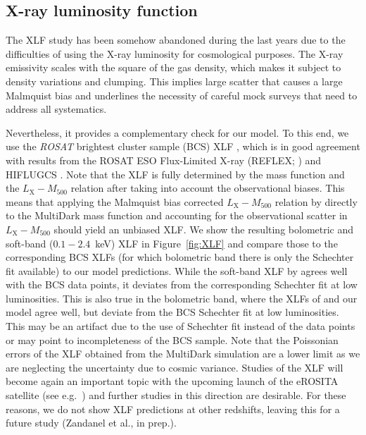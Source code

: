 \documentclass[traditabstract]{aa}
\newcommand{\rmn}{\mathrm}
\begin{document}
\subsection{X-ray luminosity function}

The XLF study has been somehow abandoned during the last years due to the
difficulties of using the X-ray luminosity for cosmological purposes. The X-ray
emissivity scales with the square of the gas density, which makes it subject to
density variations and clumping. This implies large scatter that causes a large
Malmquist bias and underlines the necessity of careful mock surveys that need to
address all systematics.

Nevertheless, it provides a complementary check for our model. To this end, we
use the \emph{ROSAT} brightest cluster sample (BCS) XLF
\citep{1997ApJ...479L.101E}, which is in good agreement with results from the
ROSAT ESO Flux-Limited X-ray (REFLEX; \citealp{2002ApJ...566...93B}) and
HIFLUGCS \citep{2002ApJ...567..716R}.  Note that the XLF is fully determined by
the mass function and the $L_{\rmn{X}}-M_{500}$ relation after taking into
account the observational biases. This means that applying the Malmquist bias
corrected $L_{\rmn{X}}-M_{500}$ relation by \cite{2010MNRAS.406.1773M} directly
to the MultiDark mass function and accounting for the observational scatter in
$L_{\rmn{X}}-M_{500}$ should yield an unbiased XLF. We show the resulting
bolometric and soft-band ($0.1-2.4$~keV) XLF in Figure~\ref{fig:XLF} and compare
those to the corresponding BCS XLFs (for which bolometric band there is only the 
Schechter fit available) to our model predictions.  While the soft-band XLF by
\cite{2010MNRAS.406.1773M} agrees well with the BCS data points, it deviates
from the corresponding Schechter fit at low luminosities. This is also true in
the bolometric band, where the XLFs of \cite{2010MNRAS.406.1773M} and our model
agree well, but deviate from the BCS Schechter fit at low luminosities. This may
be an artifact due to the use of Schechter fit instead of the data points or may
point to incompleteness of the BCS sample. Note that the Poissonian errors of
the XLF obtained from the MultiDark simulation are a lower limit as we are
neglecting the uncertainty due to cosmic variance.  Studies of the XLF will
become again an important topic with the upcoming launch of the eROSITA
satellite (see e.g.~\citealp{2011MSAIS..17..159C}) and further studies in this
direction are desirable. For these reasons, we do not show XLF predictions at
other redshifts, leaving this for a future study (Zandanel et al., in prep.).
\end{document}
